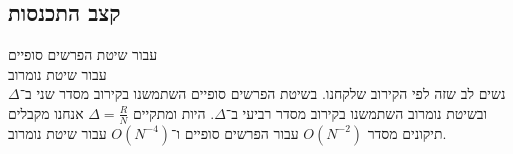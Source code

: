 \subsection{קצב התכנסות}
עבור שיטת הפרשים סופיים \\
עבור שיטת נומרוב \\
נשים לב שזה לפי הקירוב שלקחנו. בשיטת הפרשים סופיים השתמשנו בקירוב מסדר שני ב־$\Delta$ ובשיטת נומרוב השתמשנו בקירוב מסדר רביעי ב־$\Delta$. היות ומתקיים $\Delta=\frac{R}{N}$ אנחנו מקבלים תיקונים מסדר $O(N^{-2})$ עבור הפרשים סופיים ו־$O(N^{-4})$ עבור שיטת נומרוב.
